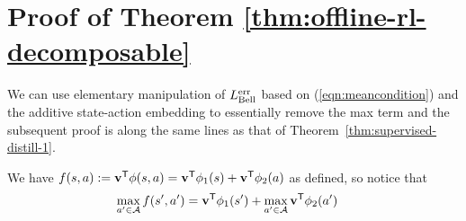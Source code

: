 \section{Proof of Theorem \ref{thm:offline-rl-decomposable}}
\label{sec:orl}

We can use elementary manipulation of $L_{\textnormal{Bell}}^{\textnormal{err}}$ based on (\ref{eqn:meancondition}) and the additive state-action embedding to essentially remove the max term and the subsequent proof is along the same lines as that of Theorem~\ref{thm:supervised-distill-1}.

We have $f(s,a):=\mathbf{v}^{\sf{T}}\phi(s,a) = \mathbf{v}^{\sf{T}}\phi_1(s) + \mathbf{v}^{\sf{T}}\phi_2(a)$ as defined, so notice that
\begin{align}
\max_{a' \in \mathcal{A}} f(s',a') &= \mathbf{v}^{\sf{T}}\phi_1(s') + \max_{a' \in \mathcal{A}} \mathbf{v}^{\sf{T}}\phi_2(a') \label{eqn:orlmax}
\end{align}

